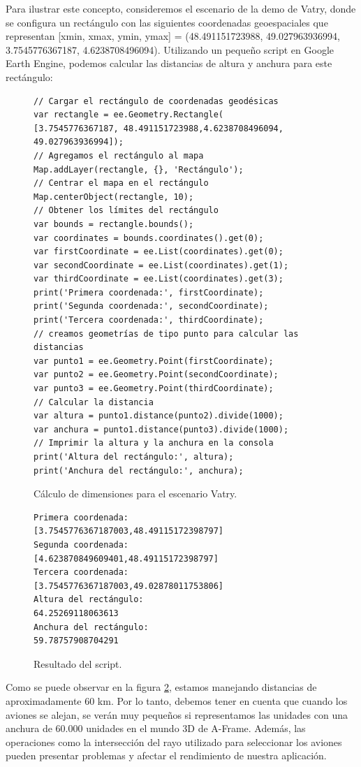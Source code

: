 \documentclass[a4paper, 11pt]{book}
\begin{document}
Para ilustrar este concepto, consideremos el escenario de la demo de Vatry, donde se configura un rectángulo con las siguientes coordenadas geoespaciales que representan [xmin, xmax, ymin, ymax] = (48.491151723988, 49.027963936994, 3.7545776367187, 4.6238708496094). Utilizando un pequeño script en Google Earth Engine, podemos calcular las distancias de altura y anchura para este rectángulo:
\begin{figure}[H]
\centering
\begin{verbatim}
// Cargar el rectángulo de coordenadas geodésicas
var rectangle = ee.Geometry.Rectangle(
[3.7545776367187, 48.491151723988,4.6238708496094, 49.027963936994]);
// Agregamos el rectángulo al mapa
Map.addLayer(rectangle, {}, 'Rectángulo');
// Centrar el mapa en el rectángulo
Map.centerObject(rectangle, 10);
// Obtener los límites del rectángulo
var bounds = rectangle.bounds();
var coordinates = bounds.coordinates().get(0);
var firstCoordinate = ee.List(coordinates).get(0);
var secondCoordinate = ee.List(coordinates).get(1);
var thirdCoordinate = ee.List(coordinates).get(3);
print('Primera coordenada:', firstCoordinate);
print('Segunda coordenada:', secondCoordinate);
print('Tercera coordenada:', thirdCoordinate);
// creamos geometrías de tipo punto para calcular las distancias
var punto1 = ee.Geometry.Point(firstCoordinate);
var punto2 = ee.Geometry.Point(secondCoordinate);
var punto3 = ee.Geometry.Point(thirdCoordinate);
// Calcular la distancia
var altura = punto1.distance(punto2).divide(1000);
var anchura = punto1.distance(punto3).divide(1000);
// Imprimir la altura y la anchura en la consola
print('Altura del rectángulo:', altura);
print('Anchura del rectángulo:', anchura);
\end{verbatim}
\caption{Cálculo de dimensiones para el escenario Vatry.
\label{codigo:dimensionesVatry}
}
\end{figure}
\begin{figure}[H]
\centering
\begin{verbatim}
Primera coordenada:
[3.7545776367187003,48.49115172398797]
Segunda coordenada:
[4.623870849609401,48.49115172398797]
Tercera coordenada:
[3.7545776367187003,49.02878011753806]
Altura del rectángulo:
64.25269118063613
Anchura del rectángulo:
59.78757908704291
\end{verbatim}
\caption{Resultado del script.
\label{codigo:resultadoDimensiones}
}
\end{figure}
Como se puede observar en la figura \ref{codigo:resultadoDimensiones}, estamos manejando distancias de aproximadamente 60 km. Por lo tanto, debemos tener en cuenta que cuando los aviones se alejan, se verán muy pequeños si representamos las unidades con una anchura de 60.000 unidades en el mundo 3D de A-Frame. Además, las operaciones como la intersección del rayo utilizado para seleccionar los aviones pueden presentar problemas y afectar el rendimiento de nuestra aplicación.
\end{document}
